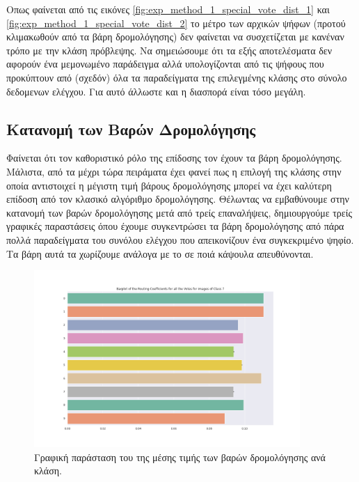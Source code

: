 Οπως φαίνεται από τις εικόνες \ref{fig:exp_method_1_special_vote_dist_1} και \ref{fig:exp_method_1_special_vote_dist_2} το μέτρο των αρχικών ψήφων (προτού κλιμακωθούν από τα βάρη δρομολόγησης) δεν φαίνεται να συσχετίζεται με κανέναν τρόπο με την κλάση πρόβλεψης. Να σημειώσουμε ότι τα εξής αποτελέσματα δεν αφορούν ένα μεμονωμένο παράδειγμα αλλά υπολογίζονται από τις ψήφους που προκύπτουν από (σχεδόν) όλα τα παραδείγματα της επιλεγμένης κλάσης στο σύνολο δεδομενων ελέγχου. Για αυτό άλλωστε και η διασπορά είναι τόσο μεγάλη.

\subsection{Κατανομή των Βαρών Δρομολόγησης}
Φαίνεται ότι τον καθοριστικό ρόλο της επίδοσης τον έχουν τα βάρη δρομολόγησης. Μάλιστα, από τα μέχρι τώρα πειράματα έχει φανεί πως η επιλογή της κλάσης στην οποία αντιστοιχεί η μέγιστη τιμή βάρους δρομολόγησης μπορεί να έχει καλύτερη επίδοση από τον κλασικό αλγόριθμο δρομολόγησης. Θέλωντας να εμβαθύνουμε στην κατανομή των βαρών δρομολόγησης μετά από τρείς επαναλήψεις, δημιουργούμε τρείς γραφικές παραστάσεις όπου έχουμε συγκεντρώσει τα βάρη δρομολόγησης από πάρα πολλά παραδείγματα του συνόλου ελέγχου που απεικονίζουν ένα συγκεκριμένο ψηφίο. Τα βάρη αυτά τα χωρίζουμε ανάλογα με το σε ποιά κάψουλα  απευθύνονται.\par
\begin{figure}[h]
    \centering
    \includegraphics[width=0.9\textwidth]{images/chapter experiments/method 1/image 13/barplot_for_class_7.png}
    \caption{Γραφική παράσταση του της μέσης τιμής των βαρών δρομολόγησης ανά κλάση.}
    \label{fig:exp_method_1_special_weight_dist_1}
  \end{figure}

